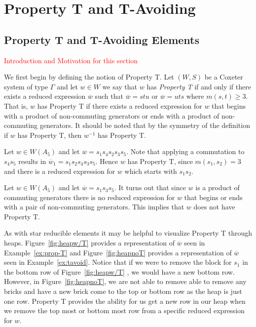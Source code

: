 \chapter{Property T and T-Avoiding}

\section{Property T and T-Avoiding Elements}\label{Tavoid}

\textcolor{red}{Introduction and Motivation for this section}

We first begin by defining the notion of Property T. Let $(W,S)$ be a Coxeter system of type $\Gamma$ and let $w \in W$ we say that $w$ has \emph{Property T} if and only if there exists a reduced expression $\overline{w}$ such that $\overline{w}=stu$ or $\overline{w}=uts$ where $m(s,t)\geq 3$. That is, $w$ has Property T if there exists a reduced expression for $w$ that begins with a product of non-commuting generators or ends with a product of non-commuting generators. It should be noted that by the symmetry of the definition if $w$ has Property T, then $w^{-1}$ has Property T.

\begin{example}\label{ex:prop-T}
Let $w \in W(A_5)$ and let $\overline{w}=s_1s_4s_2s_3s_5$. Note that applying a commutation to $s_4s_5$ results in $\overline{w}_1=s_1s_2s_4s_3s_5$. Hence $w$ has Property T, since $m(s_1,s_2)=3$ and there is a reduced expression for $w$ which starts with $s_1s_2$.	
\end{example}

\begin{example}\label{ex:tavoid}
Let $w \in W(A_5)$ and let $\overline{w}=s_1s_3s_5$. It turns out that since $w$ is a product of commuting generators there is no reduced expression for $w$ that begins or ends with a pair of non-commuting generators. This implies that $w$ does not have Property T.	
\end{example}

As with star reducible elements it may be helpful to visualize Property T through heaps. Figure~\ref{fig:heapw/T} provides a representation of $\overline{w}$ seen in Example~\ref{ex:prop-T} and Figure~\ref{fig:heapnoT} provides a representation of $\overline{w}$ seen in Example~\ref{ex:tavoid}. Notice that if we were to remove the block for $s_1$ in the bottom row of Figure~\ref{fig:heapw/T} , we would have a new bottom row. However, in Figure~\ref{fig:heapnoT}, we are not able to remove able to remove any bricks and have a new brick come to the top or bottom row as the heap is just one row.  Property T provides the ability for us get a new row in our heap when we remove the top most or bottom most row from a specific reduced expression for $w$.

